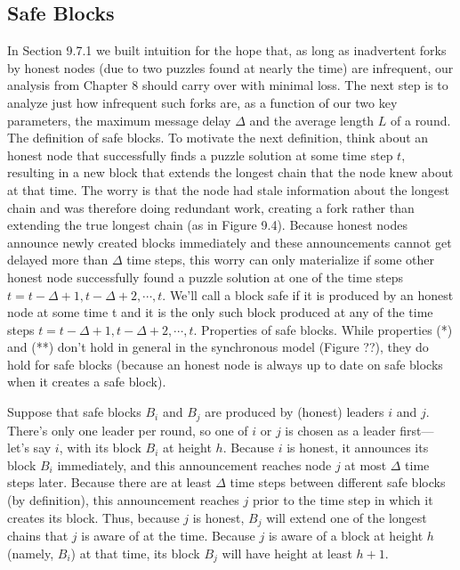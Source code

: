 \subsection{Safe Blocks}
In Section 9.7.1 we built intuition for the hope that, as long as inadvertent forks by honest nodes
(due to two puzzles found at nearly the time) are infrequent, our analysis from Chapter 8
should carry over with minimal loss. The next step is to analyze just how infrequent such
forks are, as a function of our two key parameters, the maximum message delay $\Delta$ and the
average length $L$ of a round.
The definition of safe blocks. To motivate the next definition, think about an honest
node that successfully finds a puzzle solution at some time step $t$, resulting in a new block
that extends the longest chain that the node knew about at that time. The worry is that
the node had stale information about the longest chain and was therefore doing redundant
work, creating a fork rather than extending the true longest chain (as in Figure 9.4). Because
honest nodes announce newly created blocks immediately and these announcements cannot
get delayed more than $\Delta$ time steps, this worry can only materialize if some other honest
node successfully found a puzzle solution at one of the time steps $t = t-\Delta+1, t-\Delta+2, \cdots, t$.
We’ll call a block safe if it is produced by an honest node at some time t and it
is the only such block produced at any of the time steps $t = t - \Delta + 1, t - \Delta + 2, \cdots, t$.
Properties of safe blocks. While properties (*) and (**) don’t hold in general in the
synchronous model (Figure ??), they do hold for safe blocks (because an honest node is
always up to date on safe blocks when it creates a safe block).\\

\begin{myproof}
Suppose that safe blocks $B_i$ and $B_j$ are produced by (honest) leaders $i$ and $j$. There’s
only one leader per round, so one of $i$ or $j$ is chosen as a leader first—let’s say $i$, with its
block $B_i$ at height $h$. Because $i$ is honest, it announces its block $B_i$
immediately, and this
announcement reaches node $j$ at most $\Delta$ time steps later. Because there are at least $\Delta$ time
steps between different safe blocks (by definition), this announcement reaches $j$ prior to the
time step in which it creates its block. Thus, because $j$ is honest, $B_j$ will extend one of
the longest chains that $j$ is aware of at the time. Because $j$ is aware of a block at height $h$
(namely, $B_i$) at that time, its block $B_j$ will have height at least $h + 1$. 
\end{myproof}

